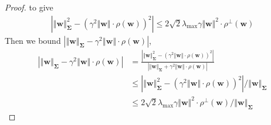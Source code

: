 \documentclass[pdflatex,sn-basic]{sn-jnl}%
\theoremstyle{thmstyleone}%
\begin{document}
\begin{appendices}
\begin{proof}
  to give 
  \begin{equation*}
  \begin{aligned}
    \left|
      \left\Vert \mathbf{w} \right\Vert_{\mathbf{\Sigma}}^2
      -
      \left(
        \gamma^2 \left\Vert \mathbf{w} \right\Vert
        \cdot
        \rho \left(\mathbf{w}\right)
      \right)^2
    \right|
    \le
    2 \sqrt{2} \lambda_{\max} 
    \gamma \Vert \mathbf{w} \Vert^2
    \cdot \rho^{\perp} \left(\mathbf{w}\right)
  \end{aligned}
  \end{equation*}
  Then we bound $\left|
      \left\Vert \mathbf{w} \right\Vert_{\mathbf{\Sigma}}
      -
      \gamma^2 \left\Vert \mathbf{w} \right\Vert
      \cdot
      \rho \left(\mathbf{w}\right)
  \right|$,
  \begin{equation*}
  \begin{aligned}
    \left|
      \left\Vert \mathbf{w} \right\Vert_{\mathbf{\Sigma}}
      -
      \gamma^2 \left\Vert \mathbf{w} \right\Vert
      \cdot
      \rho \left(\mathbf{w}\right)
    \right|
    & = 
    \frac{
      \left|
        \left\Vert \mathbf{w} \right\Vert_{\mathbf{\Sigma}}^2
          -
          \left(
            \gamma^2 \left\Vert \mathbf{w} \right\Vert
            \cdot
            \rho \left(\mathbf{w}\right)
          \right)^2
      \right|
    }{
      \left|
        \left\Vert \mathbf{w} \right\Vert_{\mathbf{\Sigma}}
        +
        \gamma^2 \left\Vert \mathbf{w} \right\Vert
        \cdot
        \rho \left(\mathbf{w}\right)
    \right|
    }
    \\ & \le 
    \left|
      \left\Vert \mathbf{w} \right\Vert_{\mathbf{\Sigma}}^2
        -
        \left(
          \gamma^2 \left\Vert \mathbf{w} \right\Vert
          \cdot
          \rho \left(\mathbf{w}\right)
        \right)^2
    \right| / \left\Vert \mathbf{w} \right\Vert_{\mathbf{\Sigma}}
    \\ & \le 
    2 \sqrt{2} \lambda_{\max} 
    \gamma \Vert \mathbf{w} \Vert^2
    \cdot \rho^{\perp} \left(\mathbf{w}\right)
     / \left\Vert \mathbf{w} \right\Vert_{\mathbf{\Sigma}}
  \end{aligned}
  \end{equation*}


\end{proof}
\end{appendices}
\end{document}
